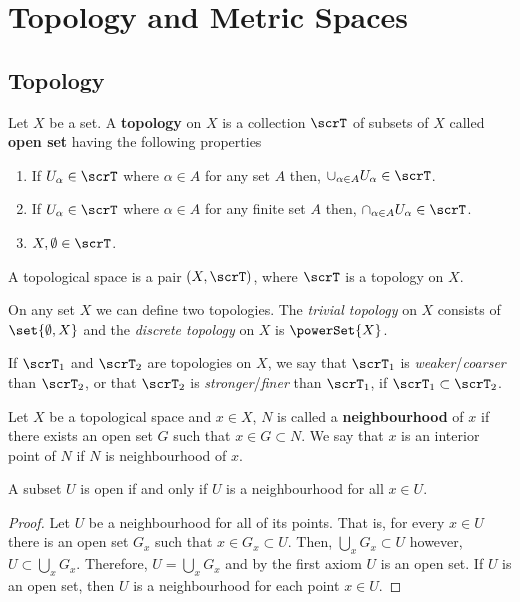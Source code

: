 \chapter{Topology and Metric Spaces}
\section{Topology}

Let \(X\) be a set. A \textbf{topology} on \(X\) is a collection \(\scrT\)  of subsets of \(X\) called \textbf{open set} having the following properties
\begin{enumerate}
    \item If \(U_{\alpha} \in \scrT\) where \(\alpha \in A\) for any set \(A\) then, \(\cup_{\alpha \in A} U_{\alpha} \in \scrT\).
    \item If \(U_{\alpha} \in \scrT\) where \(\alpha \in A\) for any finite set \(A\) then, \(\cap_{\alpha \in A} U_{\alpha} \in \scrT\).
    \item \(X,\emptyset \in \scrT\).
\end{enumerate}
A topological space is a pair \((X,\scrT)\), where \(\scrT\) is a topology on \(X\).

\begin{example}
    On any set \(X\) we can define two topologies. The \textit{trivial topology} on \(X\) consists of \(\set{\emptyset, X}\) and the \textit{discrete topology} on \(X\) is \(\powerSet{X}\).
\end{example}

If \(\scrT_1\) and \(\scrT_2\) are topologies on \(X\), we say that \(\scrT_1\) is \textit{weaker}/\textit{coarser} than \(\scrT_2\), or that \(\scrT_2\) is \textit{stronger}/\textit{finer} than \(\scrT_1\), if \(\scrT_1 \subset \scrT_2\).

\begin{definition}
    Let \(X\) be a topological space and \(x \in X\), \(N\) is called a \textbf{neighbourhood} of \(x\) if there exists an open set \(G\) such that \(x \in G \subset N\). We say that \(x\) is an interior point of \(N\) if \(N\) is neighbourhood of \(x\).
\end{definition}

\begin{proposition}
    A subset \(U\) is open if and only if \(U\) is a neighbourhood for all \(x \in U\).
\end{proposition}

\begin{proof}
    Let \(U\) be a neighbourhood for all of its points. That is, for every \(x \in U\) there is an open set \(G_x\) such that \(x \in G_x \subset U\). Then, \(\bigcup_x G_x \subset U\) however, \(U \subset \bigcup_x G_x\). Therefore, \(U = \bigcup_x G_x\) and by the first axiom \(U\) is an open set. If \(U\) is an open set, then \(U\) is a neighbourhood for each point \(x \in U\).
\end{proof}


